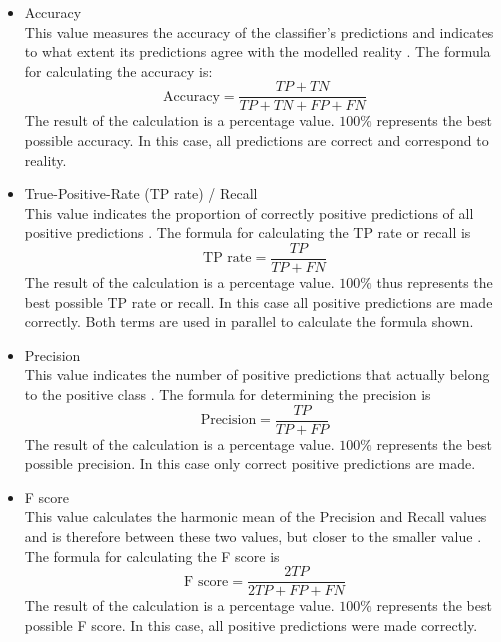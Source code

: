 \begin{itemize}
\item Accuracy
\\This value measures the accuracy of the classifier's predictions and indicates to what extent its predictions agree with the modelled reality \cite{Sammut2017}. The formula for calculating the accuracy is:
\\\[\text{Accuracy} = \frac{TP+TN}{TP+TN+FP+FN}\]
The result of the calculation is a percentage value. $100\%$ represents the best possible accuracy. In this case, all predictions are correct and correspond to reality.
\item True-Positive-Rate (TP rate) / Recall
\\This value indicates the proportion of correctly positive predictions of all positive predictions \cite{Alpaydin2010}. The formula for calculating the TP rate or recall is
\\\[\text{TP rate} = \frac{TP}{TP+FN}\]
The result of the calculation is a percentage value. $100\%$ thus represents the best possible TP rate or recall. In this case all positive predictions are made correctly. Both terms are used in parallel to calculate the formula shown.
\item Precision
\\ This value indicates the number of positive predictions that actually belong to the positive class \cite{Sammut2017}. The formula for determining the precision is
\\\[\text{Precision} = \frac{TP}{TP+FP}\]
The result of the calculation is a percentage value. $100\%$ represents the best possible precision. In this case only correct positive predictions are made.
\item F score
\\ This value calculates the harmonic mean of the Precision and Recall values and is therefore between these two values, but closer to the smaller value \cite{Sammut2017}. The formula for calculating the F score is
\\\[\text{F score} = \frac{2TP}{2TP+FP+FN}\]
The result of the calculation is a percentage value. $100\%$ represents the best possible F score. In this case, all positive predictions were made correctly.
\end{itemize}

